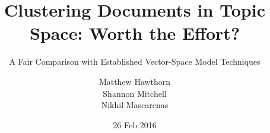 \documentclass{sig-alternate-05-2015}
\begin{document}






%

\title{Clustering Documents in Topic Space: Worth the Effort?}
\subtitle{A Fair Comparison with Established Vector-Space Model Techniques}


\author{
\alignauthor
Matthew Hawthorn\\
\alignauthor
Shannon Mitchell\\
\alignauthor 
Nikhil Mascarenas\\
}

\date{26 Feb 2016}

\maketitle

\end{document}
